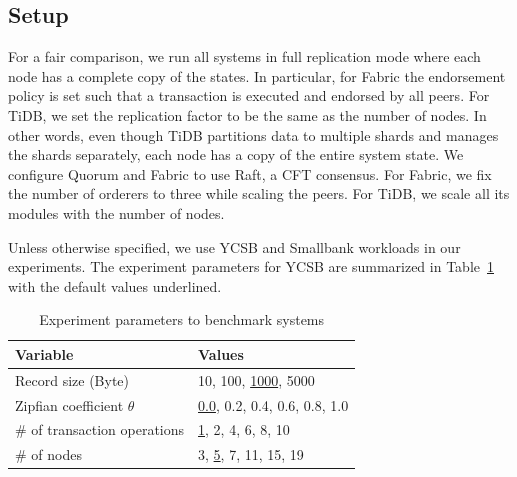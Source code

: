
\subsection{Setup}
For a fair comparison, we run all systems in full replication mode where each
node has a complete copy of the states. In particular, for Fabric the
endorsement policy is set such that a transaction is executed and endorsed by
all peers. For TiDB, we set the replication factor to be the same as the number
of nodes. In other words, even though TiDB partitions data to multiple
shards and manages the shards separately, each node has a copy of the entire
system state. We configure Quorum and Fabric to use Raft, a CFT consensus.
For Fabric, we fix the number of orderers to three while scaling the peers.
For TiDB, we scale all its modules with the number of nodes.

Unless otherwise specified, we use YCSB and Smallbank workloads in our
experiments. The experiment parameters for YCSB are summarized in
Table~\ref{tab:twin:parameter} with the default values underlined.

\begin{table}
	\centering
	\caption{Experiment parameters to benchmark systems}
	\label{tab:twin:parameter}
	\begin{tabular}{@{}ll@{}}
	\toprule
	\textbf{Variable}               & \textbf{Values}               \\
	\midrule
	Record size (Byte)               & 10, 100, \underline{1000}, 5000          \\
	Zipfian coefficient $\theta$       & \underline{0.0}, 0.2, 0.4, 0.6, 0.8, 1.0 \\
	\# of transaction operations & \underline{1}, 2, 4, 6, 8, 10            \\
	\# of nodes & 3, \underline{5}, 7, 11, 15, 19            \\
	\bottomrule
	\end{tabular}
\end{table}

